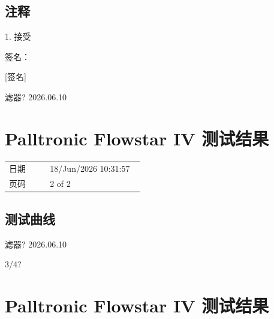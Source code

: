 \documentclass[UTF8,10pt,a4paper,fontset=fandol]{ctexart}
\newcommand{\fieldvalue}[1]{#1}
\newcommand{\handwritten}[1]{#1}
\begin{document}
\subsection*{注释}

1. 接受

签名：

\fieldvalue{\handwritten{[签名]}}

\handwritten{滤器? 2026.06.10}

\section*{Palltronic Flowstar IV 测试结果}

\begin{tabular}{@{}p{0.28\linewidth}p{0.65\linewidth}@{}}
日期 &
\fieldvalue{18/Jun/2026 10:31:57}
\\
页码 &
\fieldvalue{2 of 2}
\end{tabular}

\subsection*{测试曲线}

\begin{center}
\end{center}

\handwritten{滤器? 2026.06.10}

\handwritten{3/4?}

\newpage

\section{Palltronic Flowstar IV 测试结果}
\end{document}
